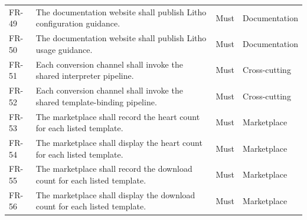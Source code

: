 \begin{xltabular}{\textwidth}{@{}p{0.12\textwidth}X p{0.15\textwidth}p{0.20\textwidth}@{}}
FR-49 & The documentation website shall publish Litho configuration guidance. & Must & Documentation \\
FR-50 & The documentation website shall publish Litho usage guidance. & Must & Documentation \\
FR-51 & Each conversion channel shall invoke the shared interpreter pipeline. & Must & Cross-cutting \\
FR-52 & Each conversion channel shall invoke the shared template-binding pipeline. & Must & Cross-cutting \\
FR-53 & The marketplace shall record the heart count for each listed template. & Must & Marketplace \\
FR-54 & The marketplace shall display the heart count for each listed template. & Must & Marketplace \\
FR-55 & The marketplace shall record the download count for each listed template. & Must & Marketplace \\
FR-56 & The marketplace shall display the download count for each listed template. & Must & Marketplace \\
\end{xltabular}


